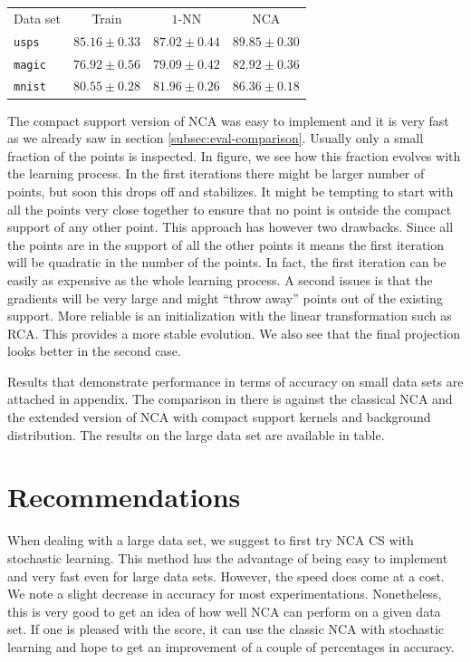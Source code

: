 \begin{table}
            	\centering
            	\begin{tabular}{lccc}
            	\toprule
            	Data set & Train & $1$-NN & NCA \\
            	\cmidrule(r){2-2}\cmidrule(r){3-3}\cmidrule(r){4-4} 
\texttt{usps}&$85.16 \pm 0.33$&$87.02 \pm 0.44$&$89.85 \pm 0.30$\\ 
  \midrule
\texttt{magic}&$76.92 \pm 0.56$&$79.09 \pm 0.42$&$82.92 \pm 0.36$\\ 
  \midrule
\texttt{mnist}&$80.55 \pm 0.28$&$81.96 \pm 0.26$&$86.36 \pm 0.18$\\ 
  \bottomrule
  \end{tabular}
\end{table}

The compact support version of NCA was easy to implement and it is very fast as we already saw in section \ref{subsec:eval-comparison}. Usually only a small fraction of the points is inspected. In figure, we see how this fraction evolves with the learning process. In the first iterations there might be larger number of points, but soon this drops off and stabilizes. It might be tempting to start with all the points very close together to ensure that no point is outside the compact support of any other point. This approach has however two drawbacks. Since all the points are in the support of all the other points it means the first iteration will be quadratic in the number of the points. In fact, the first iteration can be easily as expensive as the whole learning process. A second issues is that the gradients will be very large and might ``throw away'' points out of the existing support. More reliable is an initialization with the linear transformation such as RCA. This provides a more stable evolution. We also see that the final projection looks better in the second case.

Results that demonstrate performance in terms of accuracy on small data sets are attached in appendix. The comparison in there is against the classical NCA and the extended version of NCA with compact support kernels and background distribution. The results on the large data set are available in table. 

\section{Recommendations}
\label{sec:eval-recommendations}

When dealing with a large data set, we suggest to first try NCA CS with stochastic learning. This method has the advantage of being easy to implement and very fast even for large data sets. However, the speed does come at a cost. We note a slight decrease in accuracy for most experimentations. Nonetheless, this is very good to get an idea of how well NCA can perform on a given data set. If one is pleased with the score, it can use the classic NCA with stochastic learning and hope to get an improvement of a couple of percentages in accuracy.